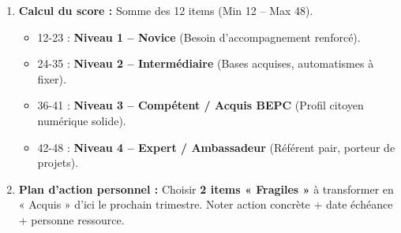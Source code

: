 \documentclass[11pt]{article}
\begin{document}
\begin{methode}
\begin{enumerate}
\begin{center}
\begin{tabularx}{\linewidth}{|>{\bfseries}l|X|X|X|X|}
    \hline
    \end{tabularx}
    \end{center}
    \item \textbf{Calcul du score :} Somme des 12 items (Min 12 -- Max 48).
    \begin{itemize}
        \item 12-23 : \textbf{Niveau 1 -- Novice} (Besoin d'accompagnement renforcé).
        \item 24-35 : \textbf{Niveau 2 -- Intermédiaire} (Bases acquises, automatismes à fixer).
        \item 36-41 : \textbf{Niveau 3 -- Compétent / Acquis BEPC} (Profil citoyen numérique solide).
        \item 42-48 : \textbf{Niveau 4 -- Expert / Ambassadeur} (Référent pair, porteur de projets).
    \end{itemize}
    \item \textbf{Plan d'action personnel :} Choisir \textbf{2 items « Fragiles »} à transformer en « Acquis » d'ici le prochain trimestre. Noter action concrète + date échéance + personne ressource.
\end{enumerate}
\end{methode}
\end{document}
